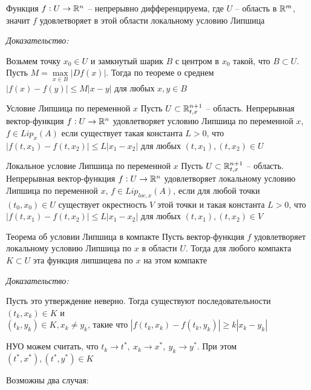 \documentclass[12pt]{article}
\begin{document}
\begin{lem}{}
    Функция $f : U \to \mathbb R^n$ -- непрерывно дифференцируема, где $U$ -- область в $\mathbb R^m$, значит $f$ удовлетворяет в этой области локальному условию Липшица
\end{lem}

\textit{Доказательство:}

Возьмем точку $x_0 \in U$ и замкнутый шарик $B$ с центром в $x_0$ такой, что $B \subset U$. Пусть $M = \max\limits_{x \in B}|Df(x)|$. Тогда по теореме о среднем $|f(x) - f(y)| \leq M|x - y|$ для любых $x, y \in B$

\begin{defin}{Условие Липшица по переменной $x$}
    Пусть $U \subset \mathbb R^{n + 1}_{t, x}$ -- область. Непрерывная вектор-функция $f : U \to \mathbb R^n$ удовлетворяет условию Липшица по переменной $x$, $f \in Lip_x(A)$ если существует такая константа $L > 0$, что $|f(t, x_1) - f(t, x_2)| \leq L|x_1 - x_2|$ для любых $(t, x_1), (t, x_2) \in U$
\end{defin}

\begin{defin}{Локальное условие Липшица по переменной $x$}
    Пусть $U \subset \mathbb R^{n + 1}_{t, x}$ -- область. Непрерывная вектор-функция $f : U \to \mathbb R^n$ удовлетворяет локальному условию Липшица по переменной $x$, $f \in Lip_{loc, x}(A)$, если для любой точки $(t_0, x_0) \in U$ существует окрестность $V$ этой точки и такая константа $L > 0$, что $|f(t, x_1) - f(t, x_2)| \leq L|x_1 - x_2|$ для любых $(t, x_1), (t, x_2) \in V$
\end{defin}

\begin{theo}{Теорема об условии Липшица в компакте}
    Пусть вектор-функция $f$ удовлетворяет локальному условию Липшица по $x$ в области $U$. Тогда для любого компакта $K \subset U$ эта функция липшицева по $x$ на этом компакте
\end{theo}

\textit{Доказательство:}

Пусть это утверждение неверно. Тогда существуют последовательности $(t_k, x_k) \in K$ и \\ 
$(t_k, y_k) \in K, x_k \neq y_k$, такие что $|f(t_k, x_k) - f(t_k, y_k)| \geq k|x_k - y_k|$

НУО можем считать, что $t_k \to t^*,\ x_k \to x^*,\ y_k \to y^*$. При этом $(t^*, x^*), (t^*, y^*) \in K$

Возможны два случая:
\end{document}
